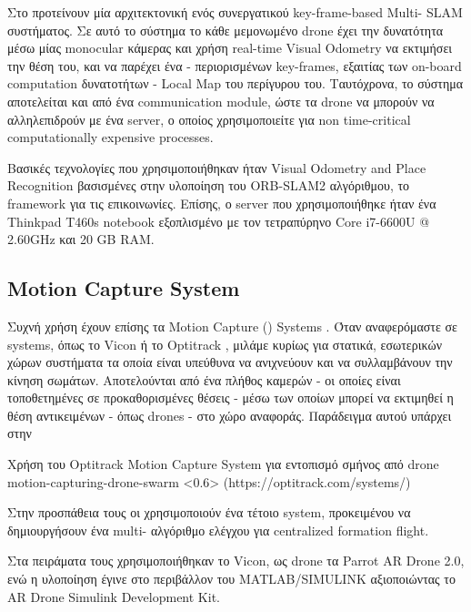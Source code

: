 Στο \cite{vslam-for-drone-localization} προτείνουν μία αρχιτεκτονική ενός συνεργατικού key-frame-based Multi- {SLAM} συστήματος. Σε αυτό το σύστημα το κάθε μεμονωμένο drone έχει την δυνατότητα μέσω μίας monocular κάμερας και χρήση real-time Visual Odometry να εκτιμήσει την θέση του, και να παρέχει ένα - περιορισμένων key-frames, εξαιτίας των on-board computation δυνατοτήτων - Local Map του περίγυρου του. Ταυτόχρονα, το σύστημα αποτελείται και από ένα communication module, ώστε τα drone να μπορούν να αλληλεπιδρούν με ένα server, ο οποίος χρησιμοποιείτε για non time-critical computationally expensive processes. 

Βασικές τεχνολογίες που χρησιμοποιήθηκαν ήταν Visual Odometry and Place Re\-co\-gni\-tion βασισμένες στην υλοποίηση του ORB-SLAM2 αλγόριθμου, το  framework για τις επικοινωνίες. Επίσης, ο server που χρησιμοποιήθηκε ήταν ένα Thinkpad T460s notebook εξοπλισμένο με τον τετραπύρηνο Core i7-6600U @ 2.60GHz και 20 GB RAM.

\subsection{Motion Capture System} \label{sec:related-motion-capturing-systems}
Συχνή χρήση έχουν επίσης τα Motion Capture () Systems \cite{motion-capture}. Όταν αναφερόμαστε σε  systems, όπως το Vicon \cite{vicon} ή το Optitrack \cite{optitrack}, μιλάμε κυρίως για στατικά, εσωτερικών χώρων συστήματα 
τα οποία είναι υπεύθυνα να ανιχνεύουν και να συλλαμβάνουν την κίνηση σωμάτων. Αποτελούνται από ένα πλήθος καμερών - οι οποίες είναι τοποθετημένες σε προκαθορισμένες θέσεις - μέσω των οποίων μπορεί να εκτιμηθεί η θέση αντικειμένων - όπως drones - στο χώρο αναφοράς. Παράδειγμα αυτού υπάρχει στην 

%
{Χρήση του Optitrack Motion Capture System για εντοπισμό σμήνος από drone}%
{motion-capturing-drone-swarm}%
<0.6>%
(https://optitrack.com/systems/)

Στην προσπάθεια τους οι \cite{related-motion-captu} χρησιμοποιούν ένα τέτοιο  system, προκειμένου να δημιουργήσουν ένα multi- αλγόριθμο ελέγχου για centralized formation flight. 

Στα πειράματα τους χρησιμοποιήθηκαν το Vicon, ως drone τα Parrot AR Drone 2.0, ενώ η υλοποίηση έγινε στο περιβάλλον του MATLAB/SI\-MU\-LI\-NK αξιοποιώντας το AR Drone Simulink Development Kit.
